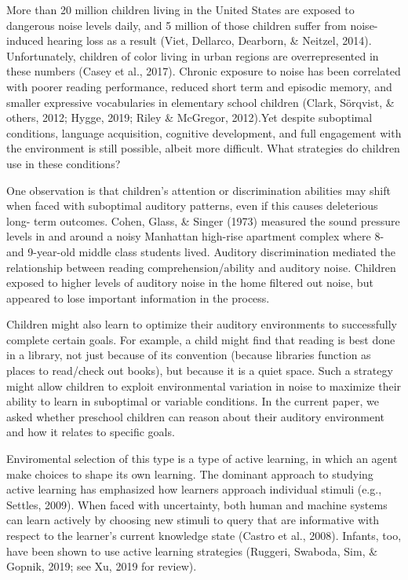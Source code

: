 \documentclass[10pt, letterpaper]{article}
\begin{document}
More than 20 million children living in the United States are exposed to
dangerous noise levels daily, and 5 million of those children suffer
from noise-induced hearing loss as a result (Viet, Dellarco, Dearborn,
\& Neitzel, 2014). Unfortunately, children of color living in urban
regions are overrepresented in these numbers (Casey et al., 2017).
Chronic exposure to noise has been correlated with poorer reading
performance, reduced short term and episodic memory, and smaller
expressive vocabularies in elementary school children (Clark, Sörqvist,
\& others, 2012; Hygge, 2019; Riley \& McGregor, 2012).Yet despite
suboptimal conditions, language acquisition, cognitive development, and
full engagement with the environment is still possible, albeit more
difficult. What strategies do children use in these conditions?

One observation is that children's attention or discrimination abilities
may shift when faced with suboptimal auditory patterns, even if this
causes deleterious long- term outcomes. Cohen, Glass, \& Singer (1973)
measured the sound pressure levels in and around a noisy Manhattan
high-rise apartment complex where 8- and 9-year-old middle class
students lived. Auditory discrimination mediated the relationship
between reading comprehension/ability and auditory noise. Children
exposed to higher levels of auditory noise in the home filtered out
noise, but appeared to lose important information in the process.

Children might also learn to optimize their auditory environments to
successfully complete certain goals. For example, a child might find
that reading is best done in a library, not just because of its
convention (because libraries function as places to read/check out
books), but because it is a quiet space. Such a strategy might allow
children to exploit environmental variation in noise to maximize their
ability to learn in suboptimal or variable conditions. In the current
paper, we asked whether preschool children can reason about their
auditory environment and how it relates to specific goals.

Enviromental selection of this type is a type of active learning, in
which an agent make choices to shape its own learning. The dominant
approach to studying active learning has emphasized how learners
approach individual stimuli (e.g., Settles, 2009). When faced with
uncertainty, both human and machine systems can learn actively by
choosing new stimuli to query that are informative with respect to the
learner's current knowledge state (Castro et al., 2008). Infants, too,
have been shown to use active learning strategies (Ruggeri, Swaboda,
Sim, \& Gopnik, 2019; see Xu, 2019 for review).
\end{document}
